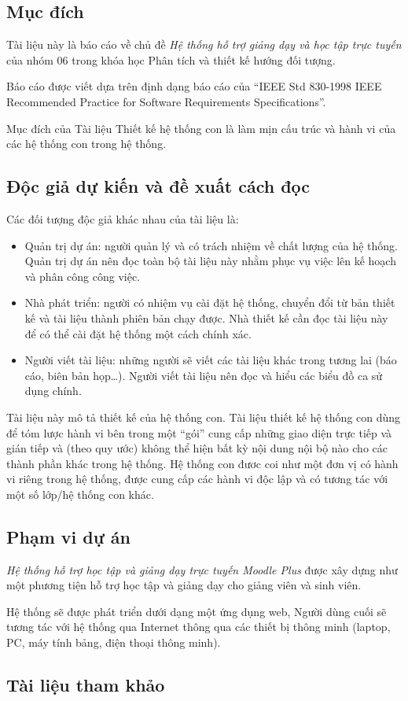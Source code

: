 \documentclass[./../main.tex]{subfiles}
\begin{document}
\subsection{Mục đích}
Tài liệu này là báo cáo về chủ đề \textit{Hệ thống hỗ trợ giảng dạy và học tập trực tuyến} của nhóm 06 trong khóa học Phân tích và thiết kế hướng đối tượng.

Báo cáo được viết dựa trên định dạng báo cáo của “IEEE Std 830-1998 IEEE Recommended Practice for Software Requirements Specifications”.

Mục đích của Tài liệu Thiết kế hệ thống con là làm mịn cấu trúc và hành vi của các hệ thống con trong hệ thống.

\subsection{Độc giả dự kiến và đề xuất cách đọc}

Các đối tượng độc giả khác nhau của tài liệu là:
\begin{itemize}
    \item Quản trị dự án: người quản lý và có trách nhiệm về chất lượng của hệ thống. Quản trị dự án nên đọc toàn bộ tài liệu này nhằm phục vụ việc lên kế hoạch và phân công công việc.
    \item Nhà phát triển: người có nhiệm vụ cài đặt hệ thống, chuyển đổi từ bản thiết kế và tài liệu thành phiên bản chạy được. Nhà thiết kế cần đọc tài liệu này để có thể cài đặt hệ thống một cách chính xác.
    \item Người viết tài liệu: những người sẽ viết các tài liệu khác trong tương lai (báo cáo, biên bản họp…). Người viết tài liệu nên đọc và hiểu các biểu đồ ca sử dụng chính.
\end{itemize}

Tài liệu này mô tả thiết kế của hệ thống con. Tài liệu thiết kế hệ thống con dùng để tóm lược hành vi bên trong một “gói” cung cấp những giao diện trực tiếp và gián tiếp và (theo quy ước) không thể hiện bất kỳ nội dung nội bộ nào cho các thành phần khác trong hệ thống. Hệ thống con đươc coi như một đơn vị có hành vi riêng trong hệ thống, được cung cấp các hành vi độc lập và có tương tác với một số lớp/hệ thống con khác.

\subsection{Phạm vi dự án}
\textit{Hệ thống hỗ trợ học tập và giảng dạy trực tuyến Moodle Plus} được xây dựng như một phương tiện hỗ trợ học tập và giảng dạy cho giảng viên và sinh viên.

Hệ thống sẽ được phát triển dưới dạng một ứng dụng web, Người dùng cuối sẽ tương tác với hệ thống qua Internet thông qua các thiết bị thông minh (laptop, PC, máy tính bảng, điện thoại thông minh).

\subsection{Tài liệu tham khảo}
\nocite{*}
\printbibliography[heading=none]
\end{document}
